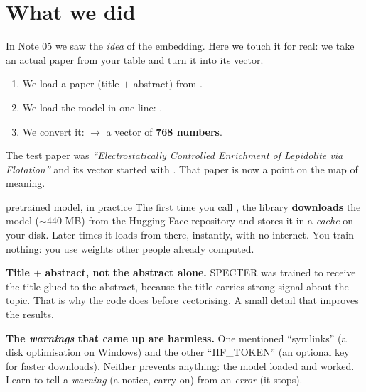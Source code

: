 \documentclass[11pt,a4paper]{article}
\begin{document}

\section{What we did}

In Note 05 we saw the \emph{idea} of the embedding. Here we touch it for real: we take an
actual paper from your table and turn it into its vector.

\begin{enumerate}
  \item We load a paper (title $+$ abstract) from .
  \item We load the model in one line: .
  \item We convert it:  $\rightarrow$ a vector of \textbf{768 numbers}.
\end{enumerate}

The test paper was \emph{``Electrostatically Controlled Enrichment of Lepidolite via
Flotation''} and its vector started with \codigo{[-0.59, -0.16, 1.34, ...]}. That paper is
now a point on the map of meaning.

\begin{concepto}{pretrained model, in practice}
The first time you call , the library
\textbf{downloads} the model ($\sim$440 MB) from the Hugging Face repository and stores it in
a \emph{cache} on your disk. Later times it loads from there, instantly, with no internet.
You train nothing: you use weights other people already computed.
\end{concepto}

\begin{ojo}
\textbf{Title $+$ abstract, not the abstract alone.} SPECTER was trained to receive the title
glued to the abstract, because the title carries strong signal about the topic. That is why
the code does  before vectorising. A small detail that
improves the results.
\end{ojo}

\begin{ojo}
\textbf{The \emph{warnings} that came up are harmless.} One mentioned ``symlinks'' (a disk
optimisation on Windows) and the other ``HF\_TOKEN'' (an optional key for faster downloads).
Neither prevents anything: the model loaded and worked. Learn to tell a \emph{warning}
(a notice, carry on) from an \emph{error} (it stops).
\end{ojo}
\end{document}
